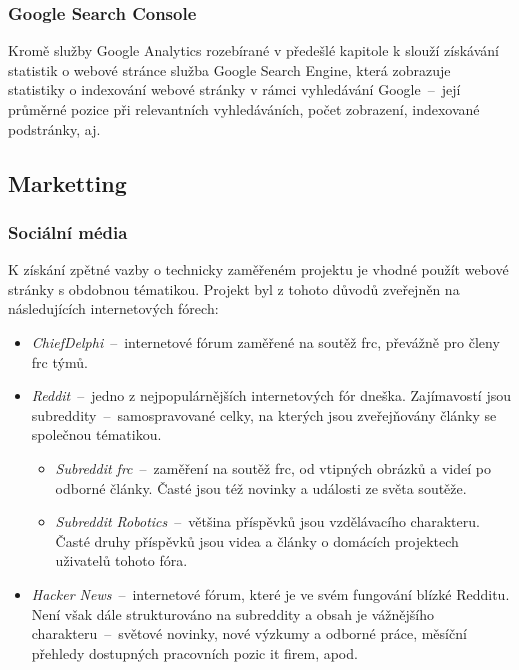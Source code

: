 \documentclass[a4paper, 12pt]{article}
\begin{document}


  \subsubsection{Google Search Console}
  Kromě služby Google Analytics rozebírané v předešlé kapitole k slouží získávání statistik o webové stránce služba Google Search Engine, která zobrazuje statistiky o indexování webové stránky v rámci vyhledávání Google~--~její průměrné pozice při relevantních vyhledáváních, počet zobrazení, indexované podstránky, aj.


  \subsection{Marketting}

  \subsubsection{Sociální média}
  K získání zpětné vazby o technicky zaměřeném projektu je vhodné použít webové stránky s obdobnou tématikou. Projekt byl z tohoto důvodů zveřejněn na následujících internetových fórech:

  {\parskip=0pt
  \begin{itemize}[topsep=\itemsep]
    \item \emph{ChiefDelphi}~--~internetové fórum zaměřené na soutěž \gls{frc}, převážně pro členy \gls{frc} týmů.
    \item \emph{Reddit}~--~jedno z nejpopulárnějších internetových fór dneška. Zajímavostí jsou subreddity~--~samospravované celky, na kterých jsou zveřejňovány články se společnou tématikou.
    \begin{itemize}[topsep=0pt]
      \item \emph{Subreddit \gls{frc}}~--~zaměření na soutěž \gls{frc}, od vtipných obrázků a videí po odborné články. Časté jsou též novinky a události ze světa soutěže.
      \item \emph{Subreddit Robotics}~--~většina příspěvků jsou vzdělávacího charakteru. Časté druhy příspěvků jsou videa a články o domácích projektech uživatelů tohoto fóra.
    \end{itemize}
    \item \emph{Hacker News}~--~internetové fórum, které je ve svém fungování blízké Redditu. Není však dále strukturováno na subreddity a obsah je vážnějšího charakteru~--~světové novinky, nové výzkumy a odborné práce, měsíční přehledy dostupných pracovních pozic \gls{it} firem, apod.
  \end{itemize}}
\end{document}
